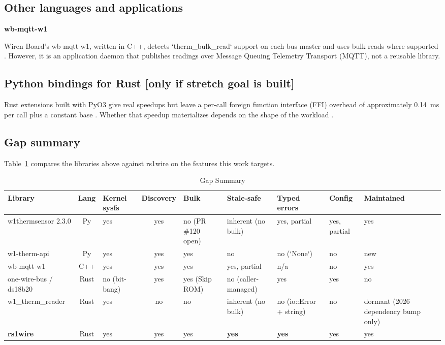 \documentclass[conference]{IEEEtran}
\begin{document}
\subsection{Other languages and applications}

\textbf{wb-mqtt-w1}

Wiren Board's wb-mqtt-w1, written in C++, detects `therm\_bulk\_read` support on each bus master and uses bulk reads where supported \cite{wb_mqtt_w1}.
However, it is an application daemon that publishes readings over Message Queuing Telemetry Transport (MQTT), not a reusable library.

\subsection{Python bindings for Rust [only if stretch goal is built]}

Rust extensions built with PyO3 give real speedups but leave a per-call foreign function interface (FFI) overhead of approximately 0.14~ms per call plus a constant base \cite{amaral2025rust}.
Whether that speedup materializes depends on the shape of the workload \cite{harding2025improving}.

\subsection{Gap summary}

Table~\ref{tab:gap} compares the libraries above against rs1wire on the features this work targets.

\begin{table}[htbp]
\caption{Gap Summary}
\begin{center}
\footnotesize
\begin{tabular}{|p{2.2cm}|c|p{1.2cm}|c|p{1.5cm}|p{1.5cm}|p{2.0cm}|p{1.3cm}|p{1.6cm}|}
\hline
\textbf{Library} & \textbf{Lang} & \textbf{Kernel sysfs} & \textbf{Discovery} & \textbf{Bulk} & \textbf{Stale-safe} & \textbf{Typed errors} & \textbf{Config} & \textbf{Maintained} \\
\hline
w1thermsensor 2.3.0 & Py & yes & yes & no (PR \#120 open) & inherent (no bulk) & yes, partial & yes, partial & yes \\
\hline
w1-therm-api & Py & yes & yes & yes & no & no (`None`) & no & new \\
\hline
wb-mqtt-w1 & C++ & yes & yes & yes & yes, partial & n/a & no & yes \\
\hline
one-wire-bus / ds18b20 & Rust & no (bit-bang) & yes & yes (Skip ROM) & no (caller-managed) & yes & yes & no \\
\hline
w1\_therm\_reader & Rust & yes & no & no & inherent (no bulk) & no (io::Error + string) & no & dormant (2026 dependency bump only) \\
\hline
\textbf{rs1wire} & Rust & yes & yes & yes & \textbf{yes} & \textbf{yes} & yes & yes \\
\hline
\end{tabular}
\label{tab:gap}
\end{center}
\end{table}
\end{document}
